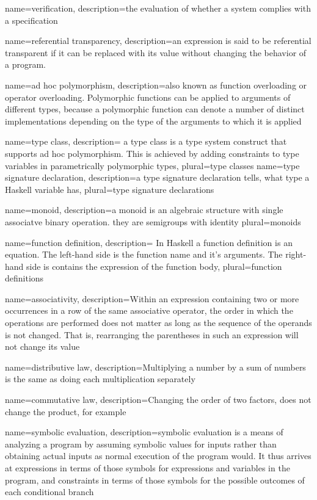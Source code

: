 {
name=verification,
description={the evaluation of whether a system complies with a specification}
}

{
name={referential transparency},
description={an expression is said to be referential transparent if it can be replaced with its value without changing the behavior of a program.}
}

{
name={ad hoc polymorphism},
description={also known as function overloading or operator overloading. Polymorphic functions can be applied to arguments of different types, because a polymorphic function can denote a number of distinct implementations depending on the type of the arguments to which it is applied}
}

{
name={type class},
description={ a type class is a type system construct that supports ad hoc polymorphism. This is achieved by adding constraints to type variables in parametrically polymorphic types},
plural={type classes}
}
{
name={type signature declaration},
description={a type signature declaration tells, what type a Haskell variable has},
plural={type signature declarations}
}

{
name={monoid},
description={a monoid is an algebraic structure with single associatve binary operation. they are semigroups with identity}
plural={monoids}
}

{
name={function definition},
description={ In Haskell a function definition is an equation. The left-hand side is the function name and it's arguments. The right-hand side is contains the expression of the function body},
plural={function definitions}
}

{
name={associativity},
description={Within an expression containing two or more occurrences in a row of the same associative operator, the order in which the operations are performed does not matter as long as the sequence of the operands is not changed. That is, rearranging the parentheses in such an expression will not change its value}
}

{
name={distributive law},
description={Multiplying a number by a sum of numbers is the same as doing each multiplication separately}
}

{
name={commutative law},
description={Changing the order of two factors, does not change the product, for example}
}

{
name={symbolic evaluation},
description={symbolic evaluation is a means of analyzing a program by assuming symbolic values for inputs rather than obtaining actual inputs as normal execution of the program would. It thus arrives at expressions in terms of those symbols for expressions and variables in the program, and constraints in terms of those symbols for the possible outcomes of each conditional branch}
}

